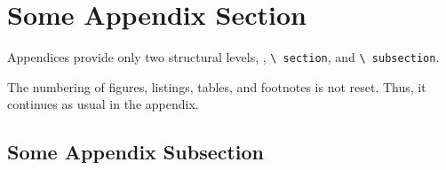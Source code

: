 \section{Some Appendix Section}\label{sec:appendix01}
Appendices provide only two structural levels, \viz, \texttt{\textbackslash{} section}, and \texttt{\textbackslash{} subsection}.

The numbering of figures, listings, tables, and footnotes is not reset. Thus, it continues as usual in the appendix.

\subsection{Some Appendix Subsection}

\lipsum[10]
